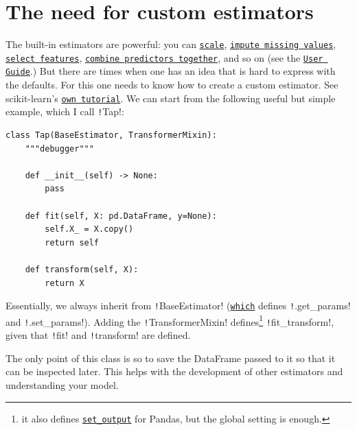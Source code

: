 \documentclass[11pt]{article}
\theoremstyle{definition}
\newcommand{\myhref}[2]{\href{#1}{\texttt{#2}}}
\begin{document}
\section{The need for custom estimators}
The built-in estimators are powerful: 
you can \myhref{https://scikit-learn.org/stable/auto_examples/preprocessing/plot_all_scaling.html\#plot-all-scaling-robust-scaler-section}
{scale},
\myhref{https://scikit-learn.org/stable/modules/impute.html\#impute}
{impute missing values},
\myhref{https://scikit-learn.org/stable/modules/feature_selection.html\#feature-selection}
{select features},
\myhref{https://scikit-learn.org/stable/modules/ensemble.html}
{combine predictors together}, 
and so on (see the 
\myhref{https://scikit-learn.org/stable/user_guide.html}
{User Guide}.) 
But there are times when one has an idea that is hard to express with the defaults. 
For this one needs to know how to create a custom estimator. See scikit-learn's 
\myhref{https://scikit-learn.org/stable/developers/develop.html}
{own tutorial}.
We can start from the following useful but simple example, which I call
\texttt!Tap!:
\begin{verbatim}
class Tap(BaseEstimator, TransformerMixin):
    """debugger"""

    def __init__(self) -> None:
        pass

    def fit(self, X: pd.DataFrame, y=None):
        self.X_ = X.copy()
        return self

    def transform(self, X):
        return X
\end{verbatim}
Essentially, we always inherit from \texttt!BaseEstimator!
(\myhref{https://scikit-learn.org/stable/modules/generated/sklearn.base.BaseEstimator.html\#sklearn.base.BaseEstimator.get_params}
{which} defines \texttt!.get_params! and \texttt!.set_params!). 
Adding the \texttt!TransformerMixin! defines\footnote{
it also defines \myhref{https://scikit-learn.org/stable/modules/generated/sklearn.base.TransformerMixin.html\#sklearn-base-transformermixin}
{set\_output} for Pandas, but the global setting is enough.
} \texttt!fit_transform!, given that \texttt!fit! and \texttt!transform! are defined. 

The only point of this class is so to save the DataFrame passed to it so that it can be inspected later. This helps with the development of other estimators and understanding your model.
\end{document}
